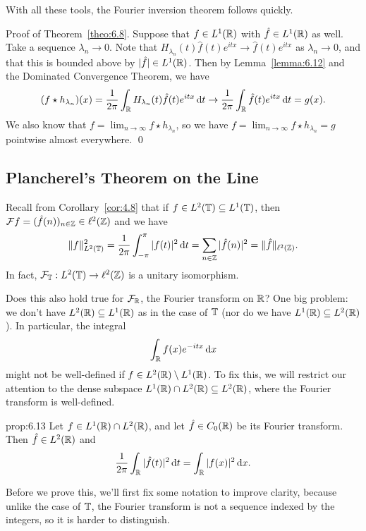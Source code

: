 With all these tools, the Fourier inversion theorem follows quickly. 

{\sc Proof of Theorem~\ref{theo:6.8}.} Suppose that $f \in L^1(\mathbb{R})$ with 
$\hat f \in L^1(\mathbb{R})$ as well. Take a sequence $\lambda_n \to 0$. 
Note that $H_{\lambda_n}(t) \hat f(t) e^{itx} \to \hat f(t) e^{itx}$ 
as $\lambda_n \to 0$, and that this is bounded above by $|\hat f| \in L^1(\mathbb{R})$. 
Then by Lemma~\ref{lemma:6.12} and the Dominated Convergence Theorem, we have 
\[ (f \star h_{\lambda_n})(x) = \frac{1}{2\pi} \int_{\mathbb{R}} H_{\lambda_n}(t) 
\hat f(t) e^{itx} \,\mathrm{d} t \to \frac{1}{2\pi} \int_{\mathbb{R}} \hat f(t) e^{itx} \,\mathrm{d} t = g(x). \]
We also know that $f = \lim_{n\to\infty} f \star h_{\lambda_n}$, so 
we have $f = \lim_{n\to\infty} f \star h_{\lambda_n} = g$ pointwise 
almost everywhere. \qed 

\subsection{Plancherel's Theorem on the Line} \label{subsec:6.4}
Recall from Corollary~\ref{cor:4.8} that if $f \in L^2(\mathbb{T}) \subseteq L^1(\mathbb{T})$, 
then ${\cal F}f = (\hat f(n))_{n\in\mathbb{Z}} \in \ell^2(\mathbb{Z})$ and we have 
\[ \|f\|_{L^2(\mathbb{T})}^2 = \frac{1}{2\pi} \int_{-\pi}^\pi |f(t)|^2\,\mathrm{d} t 
= \sum_{n\in\mathbb{Z}} |\hat f(n)|^2 = \|\hat f\|_{\ell^2(\mathbb{Z})}. \] 
In fact, ${\cal F}_{\mathbb{T}} : L^2(\mathbb{T}) \to \ell^2(\mathbb{Z})$ is a unitary isomorphism. 

Does this also hold true for ${\cal F}_{\mathbb{R}}$, the Fourier transform on $\mathbb{R}$? 
One big problem: we don't have $L^2(\mathbb{R}) \subseteq L^1(\mathbb{R})$ as in the case of 
$\mathbb{T}$ (nor do we have $L^1(\mathbb{R}) \subseteq L^2(\mathbb{R})$). In particular, 
the integral 
\[ \int_{\mathbb{R}} f(x) e^{-itx}\,\mathrm{d} x \] 
might not be well-defined if $f \in L^2(\mathbb{R}) \setminus L^1(\mathbb{R})$. To fix this, 
we will restrict our attention to the dense subspace $L^1(\mathbb{R}) \cap L^2(\mathbb{R}) 
\subseteq L^2(\mathbb{R})$, where the Fourier transform is well-defined. 

\begin{prop}{prop:6.13}
    Let $f \in L^1(\mathbb{R}) \cap L^2(\mathbb{R})$, and let $\hat f \in C_0(\mathbb{R})$ be its 
    Fourier transform. Then $\hat f \in L^2(\mathbb{R})$ and 
    \[ \frac{1}{2\pi} \int_{\mathbb{R}} |\hat f(t)|^2\,\mathrm{d} t = \int_{\mathbb{R}} |f(x)|^2\,\mathrm{d} x. \] 
\end{prop}

Before we prove this, we'll first fix some notation to improve clarity, 
because unlike the case of $\mathbb{T}$, the Fourier transform is not a sequence 
indexed by the integers, so it is harder to distinguish. 

